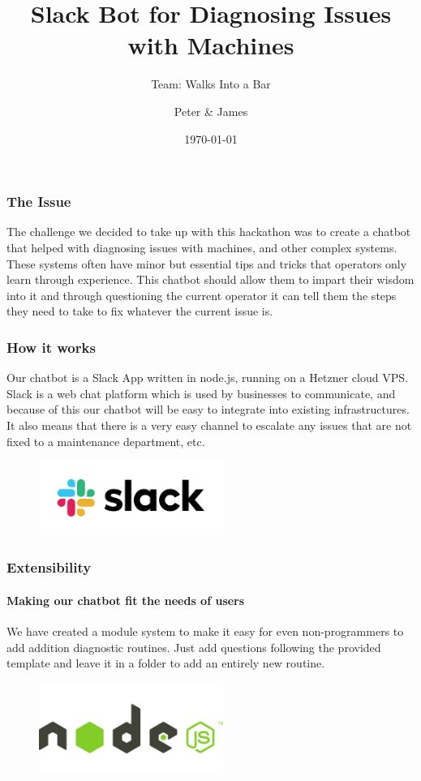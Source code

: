 \documentclass[aspectratio=169]{beamer}
\title{Slack Bot for Diagnosing Issues with Machines}
\subtitle{Team: Walks Into a Bar}
\author{Peter \& James}
\institute[]{DMS Hackathon 2020}
\date{\today}
\begin{document}
\maketitleslide

\begin{frame}{}
    \frametitle{The Issue}    
    The challenge we decided to take up with this hackathon was to create a chatbot that helped with diagnosing issues with machines, and other complex systems. These systems often have minor but essential tips and tricks that operators only learn through experience. This chatbot should allow them to impart their wisdom into it and through questioning the current operator it can tell them the steps they need to take to fix whatever the current issue is.
\end{frame}

\begin{frame}{}
    \frametitle{How it works}
    Our chatbot is a Slack App written in node.js, running on a Hetzner cloud VPS.
    Slack is a web chat platform which is used by businesses to communicate, and because of this our chatbot will be easy to integrate into existing infrastructures. It also means that there is a very easy channel to escalate any issues that are not fixed to a maintenance department, etc.
    \begin{figure}
        \centering
        \includegraphics[width=6cm]{Slack_RGB.png}
        \label{figforgot comma:slack_logo}
    \end{figure}
\end{frame}

\begin{frame}{}
    \frametitle{Extensibility}
    \framesubtitle{Making our chatbot fit the needs of users}
    We have created a module system to make it easy for even non-programmers to add addition diagnostic routines. Just add questions following the provided template and leave it in a folder to add an entirely new routine.
    \begin{figure}
        \centering
        \includegraphics[width=6cm]{node-js-736399.png}
        \label{fig:node_logo}
    \end{figure}
\end{frame}
\end{document}

